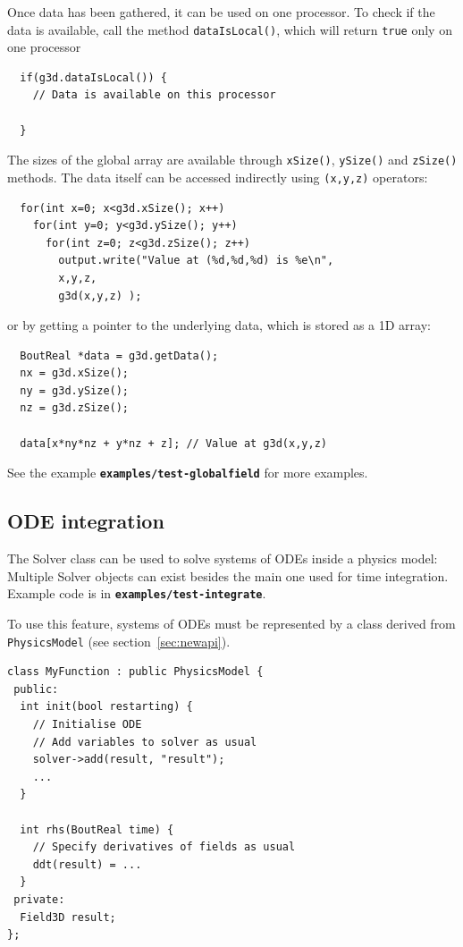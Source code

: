 \documentclass[12pt]{article}
\newcommand{\code}[1]{\texttt{#1}}
\newcommand{\file}[1]{\texttt{\bf #1}}
\begin{document}
Once data has been gathered, it can be used on one processor. To check if the data is available, call
the method \lstinline!dataIsLocal()!, which will return \lstinline!true! only on one processor
\begin{lstlisting}
  if(g3d.dataIsLocal()) {
    // Data is available on this processor
    
  }
\end{lstlisting}
The sizes of the global array are available through \lstinline!xSize()!, \lstinline!ySize()! and \lstinline!zSize()!
methods. The data itself can be accessed indirectly using \lstinline!(x,y,z)! operators:
\begin{lstlisting}
  for(int x=0; x<g3d.xSize(); x++)
    for(int y=0; y<g3d.ySize(); y++)
      for(int z=0; z<g3d.zSize(); z++)
        output.write("Value at (%d,%d,%d) is %e\n", 
        x,y,z, 
        g3d(x,y,z) );
\end{lstlisting}
or by getting a pointer to the underlying data, which is stored as a 1D array:
\begin{lstlisting}
  BoutReal *data = g3d.getData();
  nx = g3d.xSize();
  ny = g3d.ySize();
  nz = g3d.zSize();
 
  data[x*ny*nz + y*nz + z]; // Value at g3d(x,y,z)
\end{lstlisting}

See the example \file{examples/test-globalfield} for more examples.


\subsection{ODE integration}

The Solver class can be used to solve systems of ODEs inside a physics model: Multiple Solver objects
can exist besides the main one used for time integration.
Example code is in \file{examples/test-integrate}.

To use this feature, systems of ODEs must be represented by a class derived
from \code{PhysicsModel} (see section~\ref{sec:newapi}).

\begin{lstlisting}
class MyFunction : public PhysicsModel {
 public:
  int init(bool restarting) {
    // Initialise ODE
    // Add variables to solver as usual
    solver->add(result, "result");
    ...
  }
  
  int rhs(BoutReal time) {
    // Specify derivatives of fields as usual
    ddt(result) = ...
  }
 private:
  Field3D result;
};
\end{lstlisting}
\end{document}
